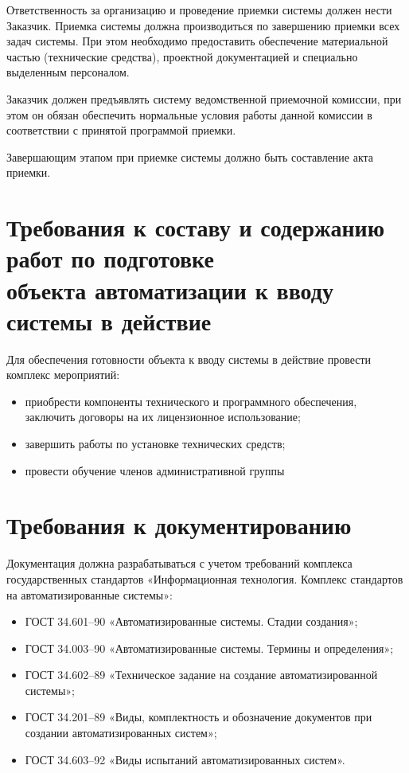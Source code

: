 \documentclass[14pt]{extreport}
\begin{document}
Ответственность за организацию и проведение приемки системы должен нести Заказчик. Приемка системы должна производиться по завершению приемки всех задач системы. При этом необходимо предоставить обеспечение материальной частью (технические средства), проектной документацией и специально выделенным персоналом.

Заказчик должен предъявлять систему ведомственной приемочной комиссии, при этом он обязан обеспечить нормальные условия работы данной комиссии в соответствии с принятой программой приемки.

Завершающим этапом при приемке системы должно быть составление акта приемки.

\newpage
\section{Требования к составу и содержанию работ по подготовке \\
объекта автоматизации к вводу системы в действие}
Для обеспечения готовности объекта к вводу системы в действие провести комплекс мероприятий:
\begin{itemize}
	\item приобрести компоненты технического и программного обеспечения, заключить договоры на их лицензионное использование;
	\item завершить работы по установке технических средств;
	\item провести обучение членов административной группы
\end{itemize}

\newpage
\section{Требования к документированию}
Документация должна разрабатываться с учетом требований комплекса государственных стандартов «Информационная технология. Комплекс стандартов на автоматизированные системы»:
\begin{itemize}
	\item ГОСТ 34.601–90 «Автоматизированные системы. Стадии создания»;
	\item ГОСТ 34.003–90 «Автоматизированные системы. Термины и определения»;
	\item ГОСТ 34.602–89 «Техническое задание на создание автоматизированной системы»;
	\item ГОСТ 34.201–89 «Виды, комплектность и обозначение документов при создании автоматизированных систем»;
	\item ГОСТ 34.603–92 «Виды испытаний автоматизированных систем».
\end{itemize}
\end{document}
